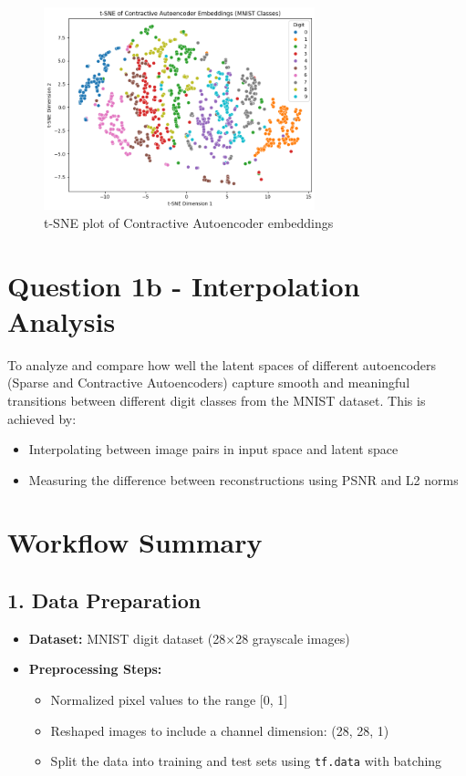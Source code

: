\documentclass[12pt]{article}
\begin{document}
\begin{figure}[h!]
\centering
\includegraphics[width=0.7\textwidth]{contractive_tsne_placeholder.png}
\caption{t-SNE plot of Contractive Autoencoder embeddings }
\end{figure}

\newpage
\section*{Question 1b - Interpolation Analysis}

To analyze and compare how well the latent spaces of different autoencoders (Sparse and Contractive Autoencoders) capture smooth and meaningful transitions between different digit classes from the MNIST dataset. This is achieved by:
\begin{itemize}
    \item Interpolating between image pairs in input space and latent space
    \item Measuring the difference between reconstructions using PSNR and L2 norms
\end{itemize}

\section*{Workflow Summary}

\subsection*{1. Data Preparation}
\begin{itemize}
    \item \textbf{Dataset:} MNIST digit dataset (28×28 grayscale images)
    \item \textbf{Preprocessing Steps:}
    \begin{itemize}
        \item Normalized pixel values to the range [0, 1]
        \item Reshaped images to include a channel dimension: (28, 28, 1)
        \item Split the data into training and test sets using \texttt{tf.data} with batching
    \end{itemize}
\end{itemize}
\end{document}
